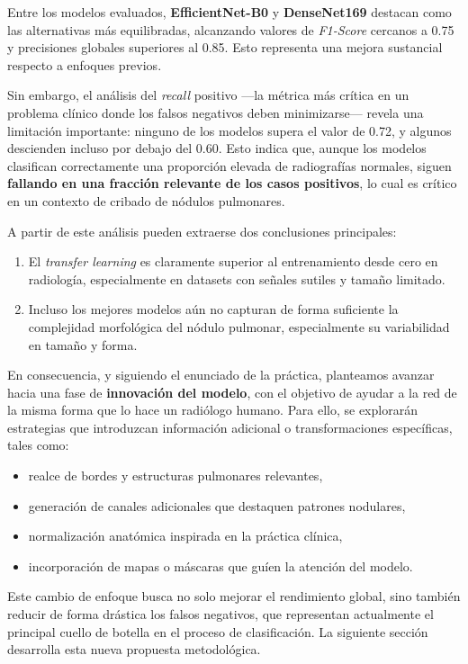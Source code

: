 \documentclass[12pt,a4paper]{article}
\begin{document}
Entre los modelos evaluados, \textbf{EfficientNet-B0} y \textbf{DenseNet169} destacan como las alternativas más equilibradas, alcanzando valores de \textit{F1-Score} cercanos a 0.75 y precisiones globales superiores al 0.85. Esto representa una mejora sustancial respecto a enfoques previos.

Sin embargo, el análisis del \textit{recall} positivo ---la métrica más crítica en un problema clínico donde los falsos negativos deben minimizarse--- revela una limitación importante: ninguno de los modelos supera el valor de 0.72, y algunos descienden incluso por debajo del 0.60. Esto indica que, aunque los modelos clasifican correctamente una proporción elevada de radiografías normales, siguen \textbf{fallando en una fracción relevante de los casos positivos}, lo cual es crítico en un contexto de cribado de nódulos pulmonares.

A partir de este análisis pueden extraerse dos conclusiones principales:

\begin{enumerate}
    \item El \textit{transfer learning} es claramente superior al entrenamiento desde cero en radiología, especialmente en datasets con señales sutiles y tamaño limitado.
    \item Incluso los mejores modelos aún no capturan de forma suficiente la complejidad morfológica del nódulo pulmonar, especialmente su variabilidad en tamaño y forma.
\end{enumerate}

En consecuencia, y siguiendo el enunciado de la práctica, planteamos avanzar hacia una fase de \textbf{innovación del modelo}, con el objetivo de ayudar a la red de la misma forma que lo hace un radiólogo humano. Para ello, se explorarán estrategias que introduzcan información adicional o transformaciones específicas, tales como:

\begin{itemize}
    \item realce de bordes y estructuras pulmonares relevantes,
    \item generación de canales adicionales que destaquen patrones nodulares,
    \item normalización anatómica inspirada en la práctica clínica,
    \item incorporación de mapas o máscaras que guíen la atención del modelo.
\end{itemize}

Este cambio de enfoque busca no solo mejorar el rendimiento global, sino también reducir de forma drástica los falsos negativos, que representan actualmente el principal cuello de botella en el proceso de clasificación. La siguiente sección desarrolla esta nueva propuesta metodológica.
\end{document}
